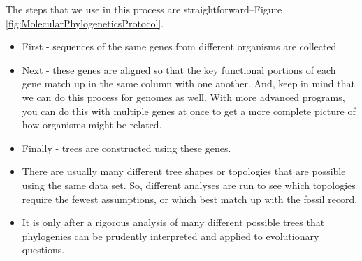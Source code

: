 \documentclass[]{article}
\begin{document}
The steps that we use in this process
are straightforward--Figure \ref{fig:MolecularPhylogeneticsProtocol}.
\begin{itemize}
	\item First - sequences of the same genes
	from different organisms are collected.
	\item Next - these genes are aligned
	so that the key functional portions
	of each gene
	match up in the same column
	with one another.
	And, keep in mind that we can do
	this process for genomes as well.
	With more advanced programs,
	you can do this with
	multiple genes at once
	to get a more complete picture
	of how organisms might be related.
	\item Finally - trees are constructed using these genes.
	\item There are usually
	many different tree shapes
	or topologies that are possible
	using the same data set.
	So, different analyses are run to see
	which topologies require
	the fewest assumptions,
	or which best match up
	with the fossil record.
	
	\item It is only after a rigorous analysis
	of many different possible trees
	that phylogenies can be
	prudently interpreted
	and applied to evolutionary questions.
	
\end{itemize}
\end{document}
